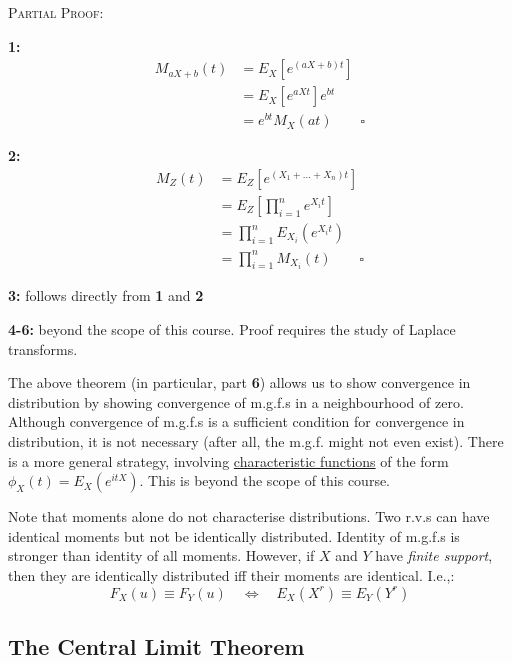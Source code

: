 \documentclass[12pt,a4paper]{article}
\begin{document}
\noindent\textsc{Partial Proof:}\par\vspace{1cm}

\textbf{1: }
\begin{align*}
M_{aX+b}(t) &= E_X\left[e^{(aX+b)t}\right]\\
&= E_X\left[e^{aXt}\right]e^{bt}\\
&= e^{bt}M_X(at)\qquad\square
\end{align*}

\textbf{2: }
\begin{align*}
M_Z(t) &= E_Z\left[e^{\left(X_1+\hdots + X_n\right) t}\right]\\
&= E_Z\left[\prod_{i=1}^n e^{X_i t}\right]\\
&= \prod_{i=1}^n E_{X_i}\left(e^{X_it}\right)\\
&= \prod_{i=1}^n M_{X_i}(t)\qquad\square
\end{align*}

\textbf{3: } follows directly from \textbf{1} and \textbf{2}\par\vspace{1cm}

\textbf{4-6:} beyond the scope of this course. Proof requires the study of Laplace transforms.\par\vspace{1cm}

The above theorem (in particular, part \textbf{6}) allows us to show convergence in distribution by showing convergence of m.g.f.s in a neighbourhood of zero. Although convergence of m.g.f.s is a sufficient condition for convergence in distribution, it is not necessary (after all, the m.g.f. might not even exist). There is a more general strategy, involving \underline{characteristic functions} of the form $\phi_X(t) = E_X\left(e^{itX}\right)$. This is beyond the scope of this course.

Note that moments alone do not characterise distributions. Two r.v.s can have identical moments but not be identically distributed. Identity of m.g.f.s is stronger than identity of all moments. However, if $X$ and $Y$ have \emph{finite support}, then they are identically distributed iff their moments are identical. I.e.,:
$$F_X(u) \equiv F_Y(u)\quad\Leftrightarrow\quad E_X(X^r) \equiv E_Y(Y^r)$$

\subsection{The Central Limit Theorem}$\;$
\end{document}
